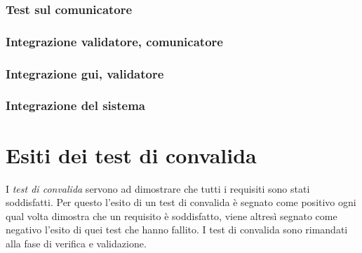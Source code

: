 \subsection{Test sul comunicatore}
\subsection{Integrazione validatore, comunicatore}
\subsection{Integrazione gui, validatore}
\subsection{Integrazione del sistema}

\chapter{Esiti dei test di convalida}
I \textit{test di convalida} servono ad dimostrare che tutti i requisiti sono stati soddisfatti. Per questo l'esito di un test di convalida \`e segnato come positivo ogni qual volta dimostra che un requisito \`e soddisfatto, viene altres\`i segnato come negativo l'esito di quei test che hanno fallito.
I test di convalida sono rimandati alla fase di verifica e validazione.

